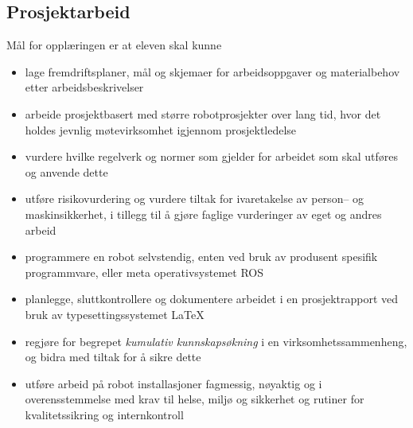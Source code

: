 \newpage

\subsection*{Prosjektarbeid}

    Mål for opplæringen er at eleven skal kunne

    \begin{itemize}
        \item lage fremdriftsplaner, mål og skjemaer for arbeidsoppgaver og materialbehov etter arbeidsbeskrivelser
        \item arbeide prosjektbasert med større robotprosjekter over lang tid, hvor det holdes jevnlig møtevirksomhet igjennom prosjektledelse
        \item vurdere hvilke regelverk og normer som gjelder for arbeidet som skal utføres og anvende dette
        \item utføre risikovurdering og vurdere tiltak for ivaretakelse av person– og maskinsikkerhet, i tillegg til å gjøre faglige vurderinger av eget og andres arbeid
        \item programmere en robot selvstendig, enten ved bruk av produsent spesifik programmvare, eller meta operativsystemet ROS
        \item planlegge, sluttkontrollere og dokumentere arbeidet i en prosjektrapport ved bruk av typesettingssystemet LaTeX
        \item regjøre for begrepet \emph{kumulativ kunnskapsøkning} i en virksomhetssammenheng, og bidra med tiltak for å sikre dette
        \item utføre arbeid på robot installasjoner fagmessig, nøyaktig og i overensstemmelse med krav til helse, miljø og sikkerhet og rutiner for kvalitetssikring og internkontroll
    \end{itemize}

